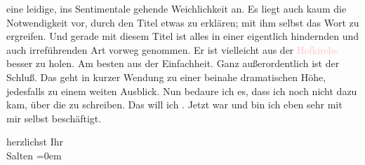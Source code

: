                eine leidige, ins Sentimentale gehende Weichlichkeit an. Es liegt auch kaum die
               Notwendigkeit vor, durch den Titel etwas zu erklären; mit ihm selbst das Wort zu
               ergreifen. Und gerade mit diesem Titel ist alles in einer eigentlich hindernden und
               auch irreführenden Art vorweg genommen. Er ist vielleicht aus der \textcolor{pink}{Hofkirche}{}\ledrightnote{\textcolor{pink}{Hofkirche}} besser zu holen. Am besten aus der Einfachheit.
               Ganz außerordentlich ist der Schluß. Das geht in kurzer Wendung {\pb}zu einer beinahe dramatischen
               Höhe, jedesfalls zu einem weiten Ausblick. Nun bedaure ich es, dass ich noch nicht
               dazu kam, über die \label{K_L03330-4v}\label{K_L03330-4h} zu schreiben. Das will
               ich \label{K_L03330-5v}\label{K_L03330-5h}. Jetzt war und bin
               ich eben sehr mit mir selbst beschäftigt.\pend
           
\pstart
           herzlichst Ihr {\\[\baselineskip]}\spacefill\mbox{Salten}\pend
           \leftskip=0em{}\endnumbering{}  
      